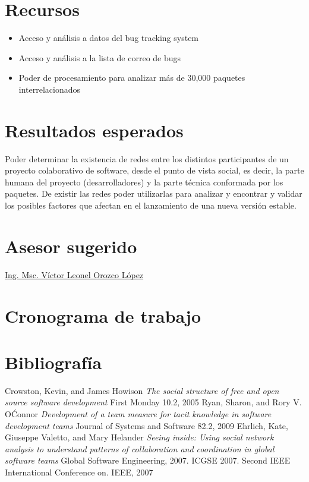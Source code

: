 \documentclass[12pt]{report}
\begin{document}
\chapter*{Recursos}
\begin{itemize}
\item Acceso y análisis a datos del bug tracking system
\item Acceso y análisis a la lista de correo de bugs
\item Poder de  procesamiento para  analizar más  de 30,000  paquetes
  interrelacionados
\end{itemize}

\chapter*{Resultados esperados}
Poder determinar  la existencia  de redes  entre los
distintos participantes de un proyecto colaborativo de software, desde
el  punto de  vista social,  es decir,  la parte  humana del  proyecto
(desarrolladores) y la  parte técnica conformada por  los paquetes. De
existir  las  redes poder  utilizarlas  para  analizar y  encontrar  y
validar los  posibles factores  que afectan en  el lanzamiento  de una
nueva versión estable.

\chapter*{Asesor sugerido}

\href{http://vorozco.com/cv/index-es.html}{Ing.  Msc.   Víctor  Leonel
Orozco López}


\chapter*{Cronograma de trabajo} %

\chapter*{Bibliografía} 
\begin{thebibliography}{9}
 Crowston,  Kevin, and James  Howison \textit{The
    social  structure of  free and  open source  software development}
First Monday 10.2, 2005
    Ryan,    Sharon,    and   Rory    V.    O\'Connor
  \textit{Development  of  a  team  measure  for  tacit  knowledge  in
    software development teams}
 Journal  of Systems  and Software 82.2, 2009
Ehrlich, Kate, Giuseppe Valetto, and Mary  Helander
\textit{Seeing inside: Using social
  network  analysis  to  understand   patterns  of  collaboration  and
  coordination   in   global   software  teams}
Global   Software Engineering,   2007.   ICGSE   2007.    Second  IEEE   International
  Conference on.   IEEE, 2007
\end{thebibliography}
\end{document}
